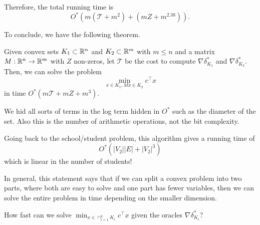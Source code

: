 Therefore, the total running time is 
\[
O^{*}(m(\mathcal{T}+m^{2})+(mZ+m^{2.38})).
\]

To conclude, we have the following theorem.
\begin{thm}
Given convex sets $K_{1}\subset\mathbb{R}^{n}$ and $K_{2}\subset\mathbb{R}^{m}$ with $m\leq n$
and a matrix $M:\mathbb{R}^{n}\rightarrow\mathbb{R}^{m}$ with $Z$ non-zeros, let $\mathcal{T}$
be the cost to compute $\nabla\delta^{*}_{K_{1}}$ and $\nabla\delta^{*}_{K_{2}}$.
Then, we can solve the problem
\[
\min_{x\in K_{1},Mx\in K_{2}}c^{\top}x
\]
in time $O^{*}(m\mathcal{T}+mZ+m^{3}).$
\end{thm}

\begin{rem*}
We hid all sorts of terms in the log term hidden in $O^{*}$ such
as the diameter of the set. Also this is the number of arithmetic
operations, not the bit complexity.
\end{rem*}
Going back to the school/student problem, this algorithm gives a running
time of
\[
O^{*}(|V_{2}||E|+|V_{2}|^{3})
\]
which is linear in the number of students!

In general, this statement says that if we can split a convex problem
into two parts, where both are easy to solve and one part has fewer
variables, then we can solve the entire problem in time depending
on the smaller dimension.
\begin{xca}
How fast can we solve $\min_{x\in\cap^{k}_{i=1}K_{i}}c^{\top}x$ given
the oracles $\nabla\delta^{*}_{K_{i}}$?
\end{xca}


